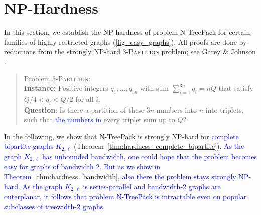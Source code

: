 \documentclass[runningheads]{llncs}
\newcommand{\xxxNTP}{{\sc N-TreePack}}
\newcommand{\lasse}[1]{\textcolor{blue}{#1}}
\begin{document}
\section{NP-Hardness}
\label{sec:hardness}
In this section, we establish the NP-hardness of problem {\xxxNTP} for certain families of
highly restricted graphs (\cref{fig_easy_graphs}). 
All proofs are done by reductions from the strongly NP-hard \textsc{3-Partition} problem;
see Garey \& Johnson \cite{garey1979computers}. 
\begin{quote}
Problem \textsc{3-Partition}: 
\\
\textbf{Instance:} Positive integers $q_1,\ldots,q_{3n}$ with sum $\sum_{i=1}^{3n}q_i=nQ$ that satisfy 
$Q/4<q_i<Q/2$ for all $i$.
\\
\textbf{Question}: Is there a partition of these $3n$ numbers into $n$ into triplets, such that \lasse{the numbers in} 
every triplet sum up to $Q$?  
\end{quote}
In the following, we show that {\xxxNTP} is strongly NP-hard for \lasse{complete bipartite graphs $K_{2,\ell}$} (Theorem~\ref{thm:hardness_complete_bipartite}). \lasse{As the graph $K_{2,\ell}$ has unbounded bandwidth, one could hope that the problem becomes easy for graphs of bandwidth 2. But as we show in Theorem~\ref{thm:hardness_bandwidth}, also there the problem stays strongly NP-hard. As the graph $K_{2,\ell}$ is series-parallel and bandwidth-2 graphs are outerplanar, it follows that problem {\xxxNTP} is intractable even on popular subclasses of treewidth-2 graphs. }
\end{document}
